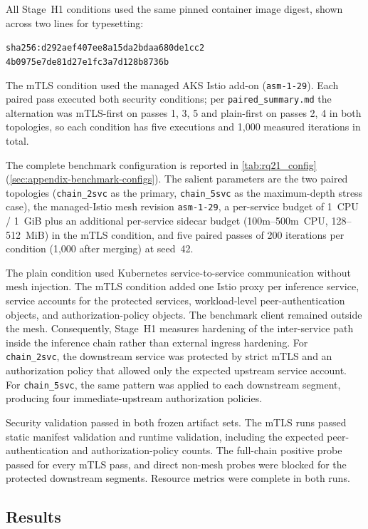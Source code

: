 All Stage~H1 conditions used the same pinned container image digest, shown across
two lines for typesetting:
\begin{center}
\small\texttt{sha256:d292aef407ee8a15da2bdaa680de1cc2}\\
\small\texttt{4b0975e7de81d27e1fc3a7d128b8736b}
\end{center}
The mTLS condition used the managed AKS Istio add-on
(\texttt{asm-1-29}). Each paired pass executed both security conditions; per
\texttt{paired\_summary.md} the alternation was mTLS-first on passes 1, 3, 5 and
plain-first on passes 2, 4 in both topologies, so each condition has five
executions and 1,000 measured iterations in total.

The complete benchmark configuration is reported in
\cref{tab:rq21_config} (\cref{sec:appendix-benchmark-configs}). The salient
parameters are the two paired topologies (\texttt{chain\_2svc} as the primary,
\texttt{chain\_5svc} as the maximum-depth stress case), the managed-Istio mesh
revision \texttt{asm-1-29}, a per-service budget of 1~CPU / 1~GiB plus an
additional per-service sidecar budget (100m--500m~CPU, 128--512~MiB) in the mTLS
condition, and five paired passes of 200 iterations per condition (1,000 after
merging) at seed~42.

The plain condition used Kubernetes service-to-service communication without mesh
injection. The mTLS condition added one Istio proxy per inference service, service
accounts for the protected services, workload-level peer-authentication objects, and
authorization-policy objects. The benchmark client remained outside the mesh.
Consequently, Stage~H1 measures hardening of the inter-service path inside the inference
chain rather than external ingress hardening. For \texttt{chain\_2svc}, the downstream
service was protected by strict mTLS and an authorization policy that allowed only the
expected upstream service account. For \texttt{chain\_5svc}, the same pattern was
applied to each downstream segment, producing four immediate-upstream authorization
policies.

Security validation passed in both frozen artifact sets. The mTLS runs passed static
manifest validation and runtime validation, including the expected
peer-authentication and authorization-policy counts. The full-chain
positive probe passed for every mTLS pass, and direct non-mesh probes were blocked for
the protected downstream segments. Resource metrics were complete in both runs.

\subsection{Results}

